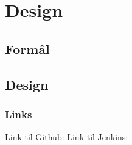\chapter{Design}
\section{Formål}
\section{Design}
\subsection{Links}
Link til Github: \newline \newline
Link til Jenkins: \\